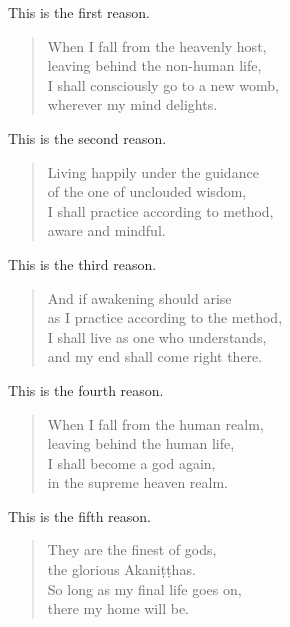 \documentclass[12pt,openany]{book}%
\begin{document}
This is the first reason. 

\begin{verse}%
When I fall from the heavenly host, \\
leaving behind the non-human life, \\
I shall consciously go to a new womb, \\
wherever my mind delights. 

%
\end{verse}

This is the second reason. 

\begin{verse}%
Living happily under the guidance \\
of the one of unclouded wisdom, \\
I shall practice according to method, \\
aware and mindful. 

%
\end{verse}

This is the third reason. 

\begin{verse}%
And if awakening should arise \\
as I practice according to the method, \\
I shall live as one who understands, \\
and my end shall come right there. 

%
\end{verse}

This is the fourth reason. 

\begin{verse}%
When I fall from the human realm, \\
leaving behind the human life, \\
I shall become a god again, \\
in the supreme heaven realm. 

%
\end{verse}

This is the fifth reason. 

\begin{verse}%
They are the finest of gods, \\
the glorious \textsanskrit{Akaniṭṭhas}. \\
So long as my final life goes on, \\
there my home will be. 

%
\end{verse}
\end{document}
